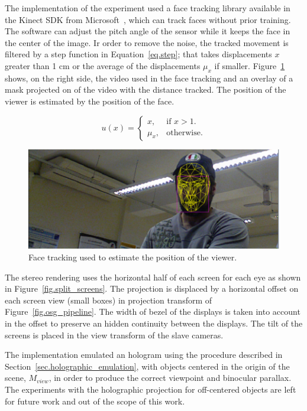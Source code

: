The implementation of the experiment used a face tracking library available in the Kinect SDK from Microsoft~\cite{Zhang2012}, which can track faces without prior training. The software can adjust the pitch angle of the sensor while it keeps the face in the center of the image. Ir order to remove the noise, the tracked movement is filtered by a step function in Equation~\ref{eq.step}; that takes displacements $x$ greater than 1 cm or the average of the displacements $\mu_x$ if smaller. Figure~\ref{fig.tracking} shows, on the right side, the video used in the face tracking and an overlay of a mask projected on of the video with the distance tracked. The position of the viewer is estimated by the position of the face.

\begin{equation}
  u(x)=\begin{cases}
    x, & \text{if $x>1$}.\\
    \mu_{x}, & \text{otherwise}.
  \end{cases}
  \label{eq.step}
\end{equation}

\begin{figure}[!hbt]
\centering
\includegraphics[width=0.7\linewidth,keepaspectratio=true]{figs/tracking_face.png}
\caption{Face tracking used to estimate the position of the viewer.}
\label{fig.tracking}
\end{figure}

The stereo rendering uses the horizontal half of each screen for each eye as shown in Figure~\ref{fig.split_screens}. The projection is displaced by a horizontal offset on each screen view (small boxes) in projection transform of Figure~\ref{fig.osg_pipeline}. The width of bezel of the displays is taken into account in the offset to preserve an hidden continuity between the displays. The tilt of the screens is placed in the view transform of the slave cameras.

The implementation emulated an hologram using the procedure described in Section~\ref{sec.holographic_emulation}, with objects centered in the origin of the scene, $M_{view}$, in order to produce the correct viewpoint and binocular parallax. The experiments with the holographic projection for off-centered objects are left for future work and out of the scope of this work.

